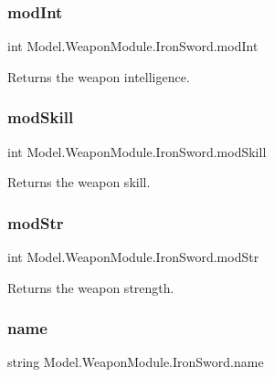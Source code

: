 \subsubsection{\texorpdfstring{mod\+Int}{modInt}}
{\footnotesize\ttfamily int Model.\+Weapon\+Module.\+Iron\+Sword.\+mod\+Int\hspace{0.3cm}{\ttfamily [get]}}

Returns the weapon intelligence. \hypertarget{class_model_1_1_weapon_module_1_1_iron_sword_a81527447c2cdeda0e634bb7ac9c2bb90}{}\label{class_model_1_1_weapon_module_1_1_iron_sword_a81527447c2cdeda0e634bb7ac9c2bb90} 
\subsubsection{\texorpdfstring{mod\+Skill}{modSkill}}
{\footnotesize\ttfamily int Model.\+Weapon\+Module.\+Iron\+Sword.\+mod\+Skill\hspace{0.3cm}{\ttfamily [get]}}

Returns the weapon skill. \hypertarget{class_model_1_1_weapon_module_1_1_iron_sword_ae2b8382a3b1cae70238fa408cf615aa7}{}\label{class_model_1_1_weapon_module_1_1_iron_sword_ae2b8382a3b1cae70238fa408cf615aa7} 
\subsubsection{\texorpdfstring{mod\+Str}{modStr}}
{\footnotesize\ttfamily int Model.\+Weapon\+Module.\+Iron\+Sword.\+mod\+Str\hspace{0.3cm}{\ttfamily [get]}}

Returns the weapon strength. \hypertarget{class_model_1_1_weapon_module_1_1_iron_sword_a57f5bf0fb116a9e6208e36dec42736b6}{}\label{class_model_1_1_weapon_module_1_1_iron_sword_a57f5bf0fb116a9e6208e36dec42736b6} 
\subsubsection{\texorpdfstring{name}{name}}
{\footnotesize\ttfamily string Model.\+Weapon\+Module.\+Iron\+Sword.\+name\hspace{0.3cm}{\ttfamily [get]}}

